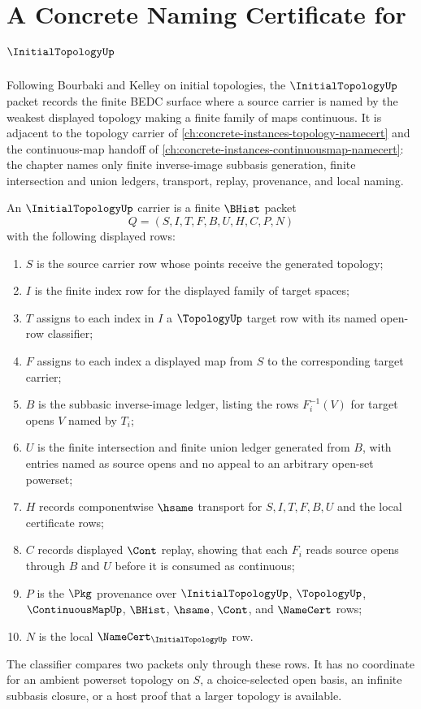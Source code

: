 \chapter{A Concrete Naming Certificate for $\InitialTopologyUp$}
\label{ch:concrete-instances-initial-topology-namecert}

Following Bourbaki and Kelley on initial topologies, the $\InitialTopologyUp$ packet records the finite BEDC surface where a source carrier is named by the weakest displayed topology making a finite family of maps continuous. It is adjacent to the topology carrier of \autoref{ch:concrete-instances-topology-namecert} and the continuous-map handoff of \autoref{ch:concrete-instances-continuousmap-namecert}: the chapter names only finite inverse-image subbasis generation, finite intersection and union ledgers, transport, replay, provenance, and local naming.

\begin{definition}
\label{def:initial-topology-carrier}
An $\InitialTopologyUp$ carrier is a finite $\BHist$ packet
$$
Q=(S,I,T,F,B,U,H,C,P,N)
$$
with the following displayed rows:
\begin{enumerate}
\item $S$ is the source carrier row whose points receive the generated topology;
\item $I$ is the finite index row for the displayed family of target spaces;
\item $T$ assigns to each index in $I$ a $\TopologyUp$ target row with its named open-row classifier;
\item $F$ assigns to each index a displayed map from $S$ to the corresponding target carrier;
\item $B$ is the subbasic inverse-image ledger, listing the rows $F_i^{-1}(V)$ for target opens $V$ named by $T_i$;
\item $U$ is the finite intersection and finite union ledger generated from $B$, with entries named as source opens and no appeal to an arbitrary open-set powerset;
\item $H$ records componentwise $\hsame$ transport for $S,I,T,F,B,U$ and the local certificate rows;
\item $C$ records displayed $\Cont$ replay, showing that each $F_i$ reads source opens through $B$ and $U$ before it is consumed as continuous;
\item $P$ is the $\Pkg$ provenance over $\InitialTopologyUp$, $\TopologyUp$, $\ContinuousMapUp$, $\BHist$, $\hsame$, $\Cont$, and $\NameCert$ rows;
\item $N$ is the local $\NameCert_{\InitialTopologyUp}$ row.
\end{enumerate}
The classifier compares two packets only through these rows. It has no coordinate for an ambient powerset topology on $S$, a choice-selected open basis, an infinite subbasis closure, or a host proof that a larger topology is available.
\end{definition}

